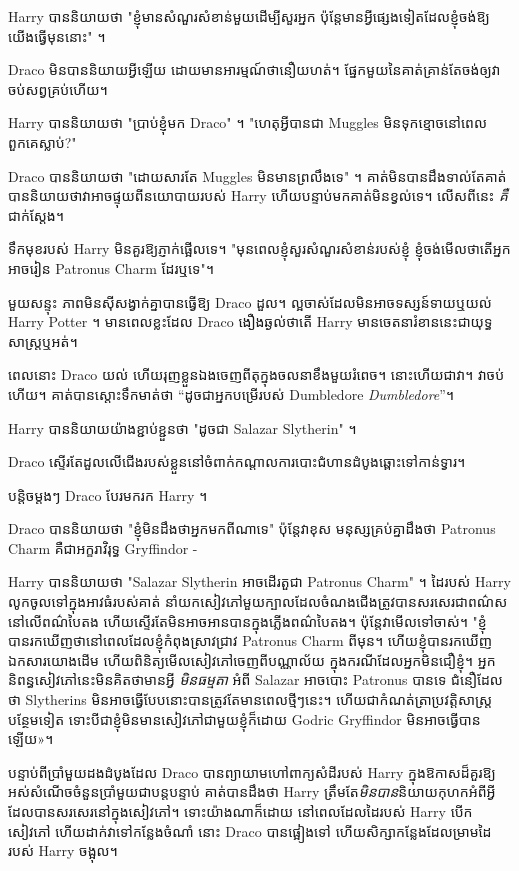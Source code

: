 Harry បាននិយាយថា "ខ្ញុំមានសំណួរសំខាន់មួយដើម្បីសួរអ្នក ប៉ុន្តែមានអ្វីផ្សេងទៀតដែលខ្ញុំចង់ឱ្យយើងធ្វើមុននោះ" ។

Draco មិន​បាន​និយាយ​អ្វី​ឡើយ ដោយ​មាន​អារម្មណ៍​ថា​នឿយ​ហត់។ ផ្នែក​មួយ​នៃ​គាត់​គ្រាន់​តែ​ចង់​ឲ្យ​វា​ចប់​សព្វគ្រប់​ហើយ។

Harry បាននិយាយថា "ប្រាប់ខ្ញុំមក Draco" ។ "ហេតុអ្វីបានជា Muggles មិនទុកខ្មោចនៅពេលពួកគេស្លាប់?"

Draco បាននិយាយថា "ដោយសារតែ Muggles មិនមានព្រលឹងទេ" ។ គាត់​មិន​បាន​ដឹង​ទាល់​តែ​គាត់​បាន​និយាយ​ថា​វា​អាច​ផ្ទុយ​ពី​នយោបាយ​របស់ Harry ហើយ​បន្ទាប់​មក​គាត់​មិន​ខ្វល់​ទេ។ លើសពីនេះ \emph{គឺ} ជាក់ស្តែង។

ទឹកមុខរបស់ Harry មិនគួរឱ្យភ្ញាក់ផ្អើលទេ។ "មុនពេលខ្ញុំសួរសំណួរសំខាន់របស់ខ្ញុំ ខ្ញុំចង់មើលថាតើអ្នកអាចរៀន Patronus Charm ដែរឬទេ"។

មួយសន្ទុះ ភាពមិនស៊ីសង្វាក់គ្នាបានធ្វើឱ្យ Draco ដួល។ ល្អចាស់ដែលមិនអាចទស្សន៍ទាយឬយល់ Harry Potter ។ មានពេលខ្លះដែល Draco ងឿងឆ្ងល់ថាតើ Harry មានចេតនារំខាននេះជាយុទ្ធសាស្ត្រឬអត់។

ពេល​នោះ Draco យល់ ហើយ​រុញ​ខ្លួន​ឯង​ចេញ​ពី​តុ​ក្នុង​ចលនា​ខឹង​មួយ​រំពេច។ នោះហើយជាវា។ វាចប់ហើយ។ គាត់បានស្ដោះទឹកមាត់ថា “ដូចជាអ្នកបម្រើរបស់ Dumbledore \emph{Dumbledore}”។

Harry បាននិយាយយ៉ាងខ្ជាប់ខ្ជួនថា "ដូចជា Salazar Slytherin" ។

Draco ស្ទើរ​តែ​ដួល​លើ​ជើង​របស់​ខ្លួន​នៅ​ចំ​ពាក់​កណ្តាល​ការ​បោះ​ជំហាន​ដំបូង​ឆ្ពោះ​ទៅ​កាន់​ទ្វារ។

បន្តិចម្ដងៗ Draco បែរមករក Harry ។

Draco បាននិយាយថា "ខ្ញុំមិនដឹងថាអ្នកមកពីណាទេ" ប៉ុន្តែវាខុស មនុស្សគ្រប់គ្នាដឹងថា Patronus Charm គឺជាអក្ខរាវិរុទ្ធ Gryffindor -

Harry បាននិយាយថា "Salazar Slytherin អាចដើរតួជា Patronus Charm" ។ ដៃរបស់ Harry លូកចូលទៅក្នុងអាវធំរបស់គាត់ នាំយកសៀវភៅមួយក្បាលដែលចំណងជើងត្រូវបានសរសេរជាពណ៌សនៅលើពណ៌បៃតង ហើយស្ទើរតែមិនអាចអានបានក្នុងភ្លើងពណ៌បៃតង។ ប៉ុន្តែវាមើលទៅចាស់។ "ខ្ញុំបានរកឃើញថានៅពេលដែលខ្ញុំកំពុងស្រាវជ្រាវ Patronus Charm ពីមុន។ ហើយខ្ញុំបានរកឃើញឯកសារយោងដើម ហើយពិនិត្យមើលសៀវភៅចេញពីបណ្ណាល័យ ក្នុងករណីដែលអ្នកមិនជឿខ្ញុំ។ អ្នកនិពន្ធសៀវភៅនេះមិនគិតថាមានអ្វី \emph{មិនធម្មតា} អំពី Salazar អាចបោះ Patronus បានទេ ជំនឿ​ដែល​ថា Slytherins មិន​អាច​ធ្វើ​បែប​នោះ​បាន​ត្រូវ​តែ​មាន​ពេល​ថ្មីៗ​នេះ។ ហើយ​ជា​កំណត់​ត្រា​ប្រវត្តិសាស្ត្រ​បន្ថែម​ទៀត ទោះ​បី​ជា​ខ្ញុំ​មិន​មាន​សៀវភៅ​ជាមួយ​ខ្ញុំ​ក៏​ដោយ Godric Gryffindor មិន​អាច​ធ្វើ​បាន​ឡើយ»។

បន្ទាប់ពីប្រាំមួយដងដំបូងដែល Draco បានព្យាយាមហៅពាក្យសំដីរបស់ Harry ក្នុងឱកាសដ៏គួរឱ្យអស់សំណើចចំនួនប្រាំមួយជាបន្តបន្ទាប់ គាត់បានដឹងថា Harry ត្រឹមតែ\emph{មិនបាន}និយាយកុហកអំពីអ្វីដែលបានសរសេរនៅក្នុងសៀវភៅ។ ទោះយ៉ាងណាក៏ដោយ នៅពេលដែលដៃរបស់ Harry បើកសៀវភៅ ហើយដាក់វាទៅកន្លែងចំណាំ នោះ Draco បានផ្អៀងទៅ ហើយសិក្សាកន្លែងដែលម្រាមដៃរបស់ Harry ចង្អុល។

